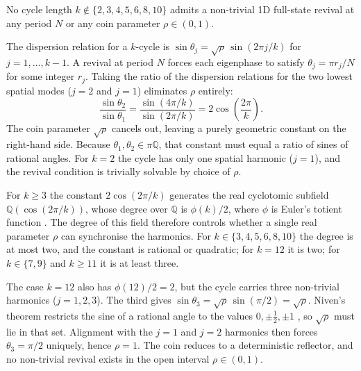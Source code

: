 \begin{conjecture}
\label{conj:no-other-k}
No cycle length $k \notin \{2, 3, 4, 5, 6, 8, 10\}$ admits a
non-trivial 1D full-state revival at any period $N$ or any coin
parameter $\rho \in (0, 1)$.
\end{conjecture}

\begin{remark}
The dispersion relation for a $k$-cycle is
$\sin\theta_j = \sqrt{\rho}\,\sin(2\pi j/k)$ for
$j = 1, \ldots, k-1$. A revival at period $N$ forces each
eigenphase to satisfy $\theta_j = \pi r_j / N$ for some integer
$r_j$. Taking the ratio of the dispersion relations for the two
lowest spatial modes ($j = 2$ and $j = 1$) eliminates $\rho$
entirely:
\begin{equation}
\frac{\sin\theta_2}{\sin\theta_1}
= \frac{\sin(4\pi / k)}{\sin(2\pi / k)}
= 2\cos\!\left(\frac{2\pi}{k}\right).
\label{eq:mode-ratio}
\end{equation}
The coin parameter $\sqrt{\rho}$ cancels out, leaving a purely
geometric constant on the right-hand side. Because
$\theta_1, \theta_2 \in \pi\mathbb{Q}$, that constant must equal
a ratio of sines of rational angles. For $k = 2$ the cycle has
only one spatial harmonic ($j = 1$), and the revival condition
is trivially solvable by choice of $\rho$.

For $k \ge 3$ the constant $2\cos(2\pi/k)$ generates the real
cyclotomic subfield $\mathbb{Q}(\cos(2\pi/k))$, whose degree over
$\mathbb{Q}$ is $\phi(k)/2$, where $\phi$ is Euler's totient
function \cite{Washington1997}. The degree of this field
therefore controls whether a single real parameter $\rho$ can
synchronise the harmonics. For $k \in \{3, 4, 5, 6, 8, 10\}$ 
the degree is at most two, and
the constant is rational or quadratic; for $k = 12$ it is two; for
$k \in \{7, 9\}$ and $k \ge 11$ it is at least three.

The case $k = 12$ also has $\phi(12)/2 = 2$, but the cycle
carries three non-trivial harmonics ($j = 1, 2, 3$). The third
gives $\sin\theta_3 = \sqrt{\rho}\,\sin(\pi/2) = \sqrt{\rho}$.
Niven's theorem restricts the sine of a rational angle to the
values $0, \pm\tfrac{1}{2}, \pm 1$ \cite{Niven1956}, so
$\sqrt{\rho}$ must lie in that set. Alignment with the $j = 1$
and $j = 2$ harmonics then forces $\theta_3 = \pi/2$ uniquely,
hence $\rho = 1$. The coin reduces to a deterministic reflector,
and no non-trivial revival exists in the open interval
$\rho \in (0,1)$.


\end{remark}

